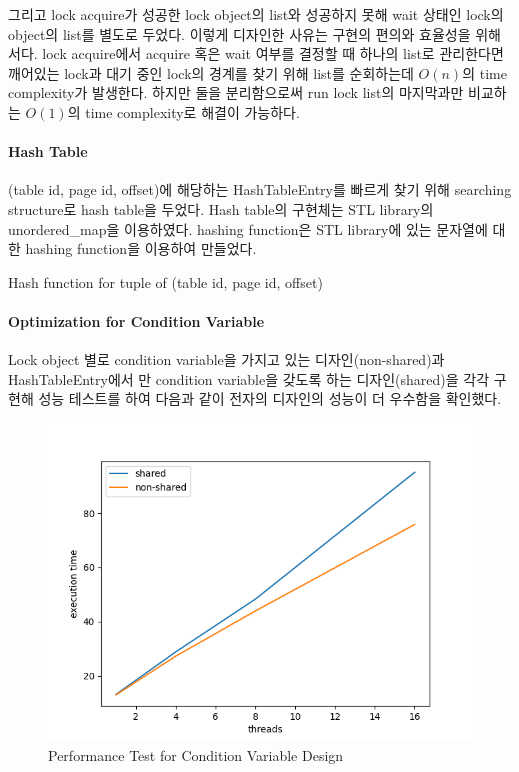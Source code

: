 \documentclass[main.tex]{subfiles}
\begin{document}
그리고 lock acquire가 성공한 lock object의 list와 성공하지 못해 wait 상태인 lock의 object의 list를 별도로 두었다.
이렇게 디자인한 사유는 구현의 편의와 효율성을 위해서다.
lock acquire에서 acquire 혹은 wait 여부를 결정할 때 하나의 list로 관리한다면 깨어있는 lock과 대기 중인 lock의 경계를 찾기 위해 list를 순회하는데 $O(n)$의 time complexity가 발생한다.
하지만 둘을 분리함으로써 run lock list의 마지막과만 비교하는 $O(1)$의 time complexity로 해결이 가능하다.

\paragraph{Hash Table}
(table id, page id, offset)에 해당하는 HashTableEntry를 빠르게 찾기 위해 searching structure로 hash table을 두었다. Hash table의 구현체는 STL library의 unordered\_map을 이용하였다.
hashing function은 STL library에 있는 문자열에 대한 hashing function을 이용하여 만들었다.

\begin{algorithm}
	\caption{Hash function for tuple of (table id, page id, offset)}
	
	\begin{algorithmic}[lines]
		\State {}
		\EndFunction
	\end{algorithmic}
\end{algorithm}

\newpage
\paragraph{Optimization for Condition Variable}
Lock object 별로 condition variable을 가지고 있는 디자인(non-shared)과 HashTableEntry에서 만 condition variable을 갖도록 하는 디자인(shared)을 각각 구현해 성능 테스트를 하여 다음과 같이 전자의 디자인의 성능이 더 우수함을 확인했다.

\begin{figure}[!hbt]
	\centering
	\includegraphics[width=.8\textwidth]{images/cc/cond_var_design.png}
	\caption{Performance Test for Condition Variable Design}
\end{figure}
\end{document}
